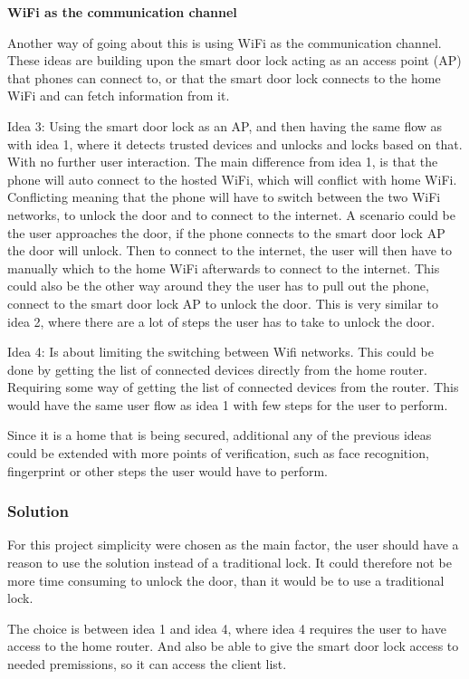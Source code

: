 \textbf{WiFi as the communication channel}

Another way of going about this is using WiFi as the communication channel.
These ideas are building upon the smart door lock acting as an access point (AP) that phones can connect to, or that the smart door lock connects to the home WiFi and can fetch information from it.

Idea 3: Using the smart door lock as an AP, and then having the same flow as with idea 1, where it detects trusted devices and unlocks and locks based on that. With no further user interaction.
The main difference from idea 1, is that the phone will auto connect to the hosted WiFi, which will conflict with home WiFi.
Conflicting meaning that the phone will have to switch between the two WiFi networks, to unlock the door and to connect to the internet.
A scenario could be the user approaches the door, if the phone connects to the smart door lock AP the door will unlock.
Then to connect to the internet, the user will then have to manually which to the home WiFi afterwards to connect to the internet.
This could also be the other way around they the user has to pull out the phone, connect to the smart door lock AP to unlock the door.
This is very similar to idea 2, where there are a lot of steps the user has to take to unlock the door.

Idea 4: Is about limiting the switching between Wifi networks.
This could be done by getting the list of connected devices directly from the home router.
Requiring some way of getting the list of connected devices from the router.
This would have the same user flow as idea 1 with few steps for the user to perform.

Since it is a home that is being secured, additional any of the previous ideas could be extended with more points of verification, such as face recognition, fingerprint or other steps the user would have to perform.

\subsubsection{Solution}
For this project simplicity were chosen as the main factor, the user should have a reason to use the solution instead of a traditional lock.
It could therefore not be more time consuming to unlock the door, than it would be to use a traditional lock.

The choice is between idea 1 and idea 4, where idea 4 requires the user to have access to the home router.
And also be able to give the smart door lock access to needed premissions, so it can access the client list.

